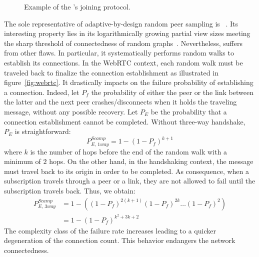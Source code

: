 \begin{figure*}
  \centering
  \hspace{8pt}
  \hspace{8pt}
  \caption{\label{fig:joiningexample}Example of the \SPRAY's joining
    protocol.}
\end{figure*}


The sole representative of adaptive-by-design random peer sampling is
\SCAMP~\cite{ganesh2001scamp,ganesh2003peer}. Its interesting property lies in
its logarithmically growing partial view sizes meeting the sharp threshold of
connectedness of random graphs~\cite{erdos1959random}. Nevertheless, \SCAMP
suffers from other flaws. In particular, it systematically performs random
walks to establish its connections. In the WebRTC context, each random walk
must be traveled back to finalize the connection establishment as illustrated
in figure~\ref{fig:webrtc}. It drastically impacts on the \SCAMP failure
probability of establishing a connection. Indeed, let $P_f$ the probability of
either the peer or the link between the latter and the next peer
crashes/disconnects when it holds the traveling message, without any possible
recovery. Let $P_E$ be the probability that a connection establishment cannot
be completed. Without three-way handshake, $P_E$ is straightforward:
\begin{equation} P_{E,\,1way}^{Scamp}=1-(1- P_f)^{k+1} \end{equation} where $k$
is the number of hops before the end of the random walk with a minimum of $2$
hops. On the other hand, in the handshaking context, the message must travel
back to its origin in order to be completed. As consequence, when a
subscription travels through a peer or a link, they are not allowed to fail
until the subscription travels back. Thus, we obtain:
\begin{align} P_{E,\,3way}^{Scamp} &=1 - ((1-P_f)^{2(k+1)} (1-P_f)^{2k}
                                     \ldots (1-P_f)^2) \nonumber \\
                                   &=1-(1-P_f)^{k^2+3k+2}
\end{align}
The complexity class of the \SCAMP failure rate increases leading to a quicker
degeneration of the connection count. This behavior endangers the network
connectedness.

